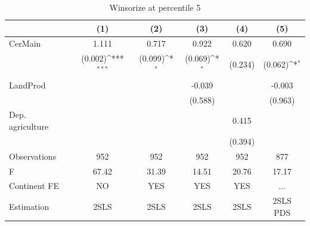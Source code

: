 \begin{table}[htbp]\centering
\def\sym#1{\ifmmode^{#1}\else\(^{#1}\)\fi}
\caption{Winsorize at percentile 5}
\begin{tabular}{l*{5}{c}}
\hline\hline
                &\multicolumn{1}{c}{(1)}         &\multicolumn{1}{c}{(2)}         &\multicolumn{1}{c}{(3)}         &\multicolumn{1}{c}{(4)}         &\multicolumn{1}{c}{(5)}         \\
\hline
CerMain         &    1.111         &    0.717         &    0.922         &    0.620         &    0.690         \\
                &  (0.002)\sym{***}&  (0.099)\sym{*}  &  (0.069)\sym{*}  &  (0.234)         &  (0.062)\sym{*}  \\
LandProd        &                  &                  &   -0.039         &                  &   -0.003         \\
                &                  &                  &  (0.588)         &                  &  (0.963)         \\
Dep. agriculture&                  &                  &                  &    0.415         &                  \\
                &                  &                  &                  &  (0.394)         &                  \\
\hline
Observations    &      952         &      952         &      952         &      952         &      877         \\
F               &    67.42         &    31.39         &    14.51         &    20.76         &    17.17         \\
Continent FE    &       NO         &      YES         &      YES         &      YES         &      ...         \\
Estimation      &     2SLS         &     2SLS         &     2SLS         &     2SLS         & 2SLS PDS         \\
\hline\hline
\end{tabular}
\end{table}
